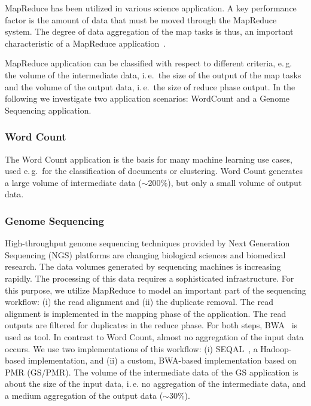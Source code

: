 \documentclass{acm_proc_article-sp}
\newcommand{\pnote}[1]{ {\textcolor{magenta} { ***pradeep: #1 }}}
\newcommand{\pnote}[1]{}
\begin{document}
MapReduce has been utilized in various science application. A key performance 
factor is the amount of data that must be moved through the MapReduce system. 
The degree of data aggregation of the map tasks is thus, an important 
characteristic of a MapReduce application~\cite{weissman-mr-11}.

MapReduce application can be classified with respect to different criteria,
e.\,g.\, the volume of the intermediate data, i.\,e.\ the size of the output
of the map tasks and the volume of the output data, i.\,e.\ the size of reduce
phase output. In the following we investigate two application scenarios: 
WordCount and a Genome Sequencing application.


\subsubsection*{Word Count}

The Word Count application is the basis for many machine learning use cases, 
used e.\,g.\ for the classification of documents or clustering. Word Count 
generates a large volume of intermediate data ($\sim$200$\%$), but only a 
small volume of output data.


\subsubsection*{Genome Sequencing}

High-throughput genome sequencing techniques provided by Next Generation
Sequencing (NGS) platforms are changing biological sciences and biomedical
research. The data volumes generated by sequencing machines is 
increasing rapidly. The processing of this data requires a sophisticated 
infrastructure. For this purpose, we utilize MapReduce to model an important 
part of the sequencing workflow: (i) the read alignment and (ii) the 
duplicate removal. The read alignment is implemented in the mapping phase of 
the application. The read outputs are filtered for duplicates in the reduce 
phase. For both steps, BWA~\cite{Li:2010:FAL:1741823.1741825} is used as tool. 
In contrast to Word Count, almost no aggregation of the input data occurs.
We use two implementations of this workflow: (i) SEQAL~\cite{seal-2011}, a 
Hadoop-based implementation, and (ii) a custom, BWA-based implementation based 
on PMR (GS/PMR). The volume of the intermediate data of the GS application is 
about the size of the input data, i.\,e. no aggregation of the intermediate 
data, and a medium aggregation of the output data ($\sim$30$\%$).
\end{document}
